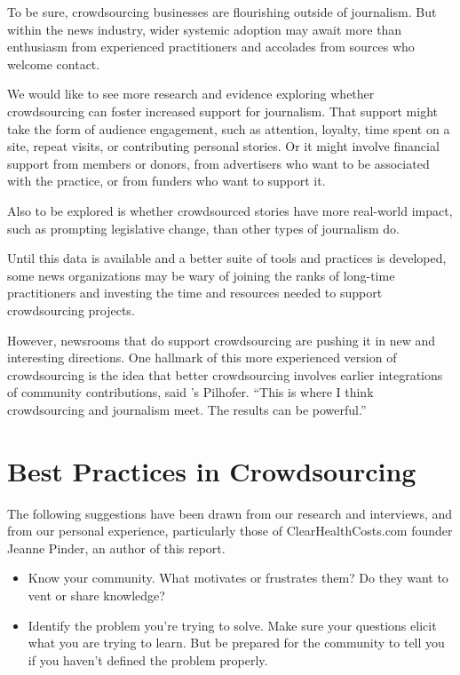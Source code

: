 \begin{itemize}
To be sure, crowdsourcing businesses are flourishing outside of journalism. But within the news industry, wider systemic adoption may await more than enthusiasm from experienced practitioners and accolades from sources who welcome contact.  

We would like to see more research and evidence exploring whether crowdsourcing can foster increased support for journalism. That support might take the form of audience engagement, such as attention, loyalty, time spent on a site, repeat visits, or contributing personal stories. Or it might involve financial support from members or donors, from advertisers who want to be associated with the practice, or from funders who want to support it. 

Also to be explored is whether crowdsourced stories have more real-world impact, such as prompting legislative change, than other types of journalism do. 

Until this data is available and a better suite of tools and practices is developed, some news organizations may be wary of joining the ranks of long-time practitioners and investing the time and resources needed to support crowdsourcing projects.

However, newsrooms that do support crowdsourcing are pushing it in new and interesting directions. One hallmark of this more experienced version of crowdsourcing is the idea that better crowdsourcing involves earlier integrations of community contributions, said ’s Pilhofer. ``This is where I think crowdsourcing and journalism meet. The results can be powerful.''


\section{Best Practices in Crowdsourcing} 

The following suggestions have been drawn from our research and interviews, and from our personal experience, particularly those of ClearHealthCosts.com founder Jeanne Pinder, an author of this report. 
\begin{itemize}
\item Know your community. What motivates or frustrates them? Do they want to vent or share knowledge?

\item Identify the problem you’re trying to solve. Make sure your questions elicit what you are trying to learn. But be prepared for the community to tell you if you haven’t defined the problem properly.


\end{itemize}
\end{itemize}
